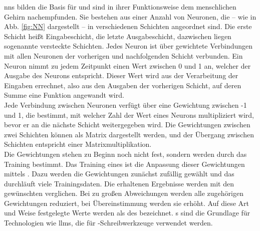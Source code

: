 \documentclass[../main.tex]{subfiles}
\begin{document}
\glspl{nn} bilden die Basis für  und sind in ihrer Funktionsweise dem menschlichen Gehirn nachempfunden. Sie bestehen aus einer Anzahl von Neuronen, die – wie in Abb. \ref{fig:NN} dargestellt – in verschiedenen Schichten angeordnet sind. Die erste Schicht heißt Eingabeschicht, die letzte Ausgabeschicht, dazwischen liegen sogenannte versteckte Schichten. Jedes Neuron ist über gewichtete Verbindungen mit allen Neuronen der vorherigen und nachfolgenden Schicht verbunden. Ein Neuron nimmt zu jedem Zeitpunkt einen Wert zwischen 0 und 1 an, welcher der Ausgabe des Neurons entspricht. Dieser Wert wird aus der Verarbeitung der Eingaben errechnet, also aus den Ausgaben der vorherigen Schicht, auf deren Summe eine Funktion angewandt wird. \\ 
Jede Verbindung zwischen Neuronen verfügt über eine Gewichtung zwischen -1 und 1, die bestimmt, mit welcher Zahl der Wert eines Neurons multipliziert wird, bevor er an die nächste Schicht weitergegeben wird. Die Gewichtungen zwischen zwei Schichten können als Matrix dargestellt werden, und der Übergang zwischen Schichten entspricht einer Matrixmultiplikation. \\
Die Gewichtungen stehen zu Beginn noch nicht fest, sondern werden durch das Training bestimmt. Das Training eines  ist die Anpassung dieser Gewichtungen mittels . Dazu werden die Gewichtungen zunächst zufällig gewählt und das  durchläuft viele Trainingsdaten. Die erhaltenen Ergebnisse werden mit den gewünschten verglichen. Bei zu großen Abweichungen werden alle zugehörigen Gewichtungen reduziert, bei Übereinstimmung werden sie erhöht. Auf diese Art und Weise festgelegte Werte werden als  des  bezeichnet. s sind die Grundlage für Technologien wie \glspl{llm}, die für -Schreibwerkzeuge verwendet werden. 
\end{document}
